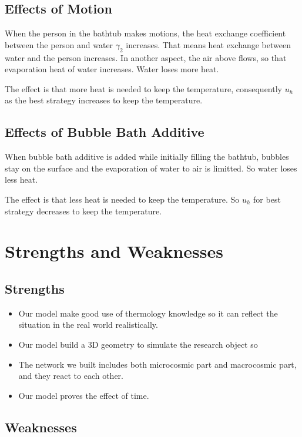 \documentclass[12pt,a4paper,titlepage]{article}
\begin{document}
\subsection{Effects of Motion}
\label{sec:effects of motion}
When the person in the bathtub makes motions, the heat exchange coefficient between the person and water ${\gamma}_2$ increases. That means heat exchange between water and the person increases. In another aspect, the air above flows, so that evaporation heat of water increases. Water loses more heat.

The effect is that more heat is needed to keep the temperature, consequently $u_h$ as the best strategy increases to keep the temperature. 

\subsection{Effects of Bubble Bath Additive}
\label{sec:effects of bubble bath additive}
When bubble bath additive is added while initially filling the bathtub, bubbles stay on the surface and the evaporation of water to air is limitted. So water loses less heat.

The effect is that less heat is needed to keep the temperature. So $u_h$ for best strategy decreases to keep the temperature.

\section{Strengths and Weaknesses}
\label{sec:strengths-and-weaknesses}

\subsection*{Strengths}
\label{sec:strengths}

\begin{itemize}
\item Our model make good use of thermology knowledge so it can reflect the situation in the real world realistically.
\item Our model build a 3D geometry to simulate the research object so
\item The network we built includes both microcosmic part and
  macrocosmic part, and they react to each other.
\item Our model proves the effect of time.
\end{itemize}

\subsection*{Weaknesses}
\label{sec:weaknesses}
\end{document}
